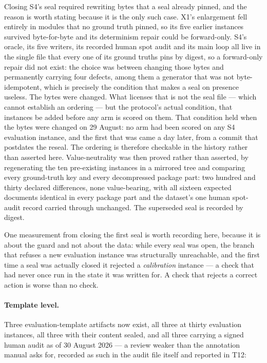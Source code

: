 Closing S4's seal required rewriting bytes that a seal already pinned, and the reason is
worth stating because it is the only such case. X1's enlargement fell entirely in modules
that no ground truth pinned, so its five earlier instances survived byte-for-byte and its
determinism repair could be forward-only. S4's oracle, its five writers, its recorded human
spot audit and its main loop all live in the single file that every one of its ground truths
pins by digest, so a forward-only repair did not exist: the choice was between changing those
bytes and permanently carrying four defects, among them a generator that was not
byte-idempotent, which is precisely the condition that makes a seal on presence useless.
The bytes were changed. What licenses that is not the seal file --- which cannot establish
an ordering --- but the protocol's actual condition, that instances be added before any arm
is scored on them. That condition held when the bytes were changed on 29 August: no arm had
been scored on any S4 evaluation instance, and the first that was came a day later, from a
commit that postdates the reseal. The ordering is therefore checkable in the history rather
than asserted here. Value-neutrality
was then proved rather than asserted, by regenerating the ten pre-existing instances in a
mirrored tree and comparing every ground-truth key and every decompressed package part:
two hundred and thirty declared differences, none value-bearing, with all sixteen expected
documents identical in every package part and the dataset's one human spot-audit record
carried through unchanged. The superseded seal is recorded by digest.

One measurement from closing the first seal is worth recording here, because it is about the
guard and not about the data: while every seal was open, the branch that refuses a new
evaluation instance was structurally unreachable, and the first time a seal was actually
closed it rejected a \emph{calibration} instance --- a check that had never once run in the
state it was written for. A check that rejects a correct action is worse than no check.

\paragraph{Template level.}
Three evaluation-template artifacts now exist, all three at thirty evaluation instances, all
three with their content sealed, and all three carrying a signed human audit as of 30 August
2026 --- a review weaker than the annotation manual asks for, recorded as such in the audit
file itself and reported in T12:

